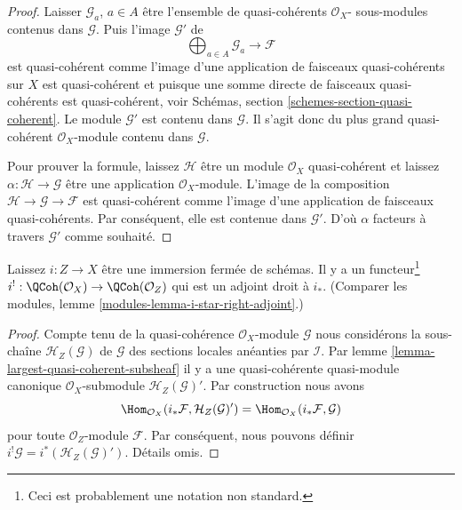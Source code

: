 \begin{proof}

Laisser $\mathcal{G}_a$, $a \in A$ être l'ensemble de quasi-cohérents
$\mathcal{O}_X$- sous-modules contenus dans $\mathcal{G}$. Puis l'image $\mathcal{G}'$ de
$$
\bigoplus\nolimits_{a \in A} \mathcal{G}_a \longrightarrow \mathcal{F}
$$
est quasi-cohérent comme l'image d'une application de faisceaux quasi-cohérents sur $X$ est quasi-cohérent et puisque une somme directe de faisceaux quasi-cohérents est quasi-cohérent, voir Schémas, section \ref{schemes-section-quasi-coherent}. Le module $\mathcal{G}'$ est contenu dans $\mathcal{G}$. Il s'agit donc du plus grand quasi-cohérent $\mathcal{O}_X$-module contenu dans $\mathcal{G}$.

\medskip\noindent
Pour prouver la formule, laissez $\mathcal{H}$ être un module $\mathcal{O}_X$ quasi-cohérent et laissez $\alpha : \mathcal{H} \to \mathcal{G}$ être une application $\mathcal{O}_X$-module. L'image de la composition $\mathcal{H} \to \mathcal{G} \to \mathcal{F}$ est quasi-cohérent comme l'image d'une application de faisceaux quasi-cohérents. Par conséquent, elle est contenue dans $\mathcal{G}'$. D'où $\alpha$ facteurs à travers $\mathcal{G}'$ comme souhaité.
\end{proof}

\begin{lemma}

\label{lemma-i-upper-shriek}
Laissez $i : Z \to X$ être une immersion fermée de schémas. Il y a un functeur\footnote{Ceci est probablement une notation non standard.} $i^! : \QCoh(\mathcal{O}_X) \to \QCoh(\mathcal{O}_Z)$ qui est un adjoint droit à $i_*$. (Comparer les modules, lemme \ref{modules-lemma-i-star-right-adjoint}.)
\end{lemma}

\begin{proof}
Compte tenu de la quasi-cohérence $\mathcal{O}_X$-module $\mathcal{G}$ nous considérons la sous-chaîne $\mathcal{H}_Z(\mathcal{G})$ de $\mathcal{G}$ des sections locales anéanties par $\mathcal{I}$. Par lemme \ref{lemma-largest-quasi-coherent-subsheaf} il y a une quasi-cohérente quasi-module canonique $\mathcal{O}_X$-submodule $\mathcal{H}_Z(\mathcal{G})'$. Par construction nous avons $$
\Hom_{\mathcal{O}_X}(i_*\mathcal{F}, \mathcal{H}_Z(\mathcal{G})')
=
\Hom_{\mathcal{O}_X}(i_*\mathcal{F}, \mathcal{G})
$$ pour toute $\mathcal{O}_Z$-module $\mathcal{F}$. Par conséquent, nous pouvons définir $i^!\mathcal{G} = i^*(\mathcal{H}_Z(\mathcal{G})')$. Détails omis.
\end{proof}

